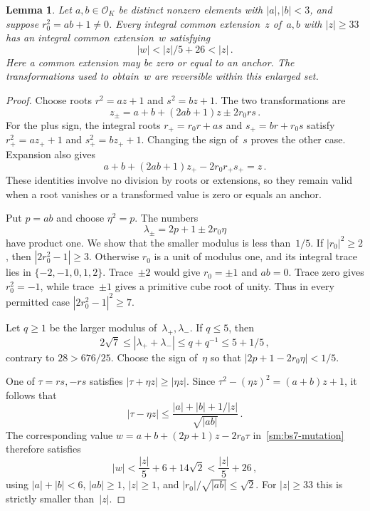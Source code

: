 \documentclass[12pt]{article}
\newtheorem{lemma}[theorem]{Lemma}
\newcommand{\OK}{\mathcal O_K}
\numberwithin{equation}{section}
\begin{document}
\begin{lemma}\label{sm:bs7-descent}
Let $a,b\in\OK$ be distinct nonzero elements with $|a|,|b|<3$, and suppose $r_0^2=ab+1\ne0$. Every integral common extension~$z$ of~$a,b$ with $|z|\ge33$ has an integral common extension~$w$ satisfying
\begin{equation*}
 |w|<|z|/5+26<|z|\,.
\end{equation*}
Here a common extension may be zero or equal to an anchor. The transformations used to obtain~$w$ are reversible within this enlarged set.
\end{lemma}
\begin{proof}
Choose roots $r^2=az+1$ and $s^2=bz+1$. The two transformations are
\begin{equation}\label{sm:bs7-mutation}
 z_\pm=a+b+(2ab+1)z\pm2r_0rs\,.
\end{equation}
For the plus sign, the integral roots $r_+=r_0r+as$ and $s_+=br+r_0s$ satisfy $r_+^2=az_++1$ and $s_+^2=bz_++1$. Changing the sign of~$s$ proves the other case. Expansion also gives
\begin{equation*}
 a+b+(2ab+1)z_+-2r_0r_+s_+=z\,.
\end{equation*}
These identities involve no division by roots or extensions, so they remain valid when a root vanishes or a transformed value is zero or equals an anchor.

Put $p=ab$ and choose $\eta^2=p$. The numbers
\begin{equation*}
 \lambda_\pm=2p+1\pm2r_0\eta
\end{equation*}
have product one. We show that the smaller modulus is less than~$1/5$. If $|r_0|^2\ge2$, then $|2r_0^2-1|\ge3$. Otherwise $r_0$ is a unit of modulus one, and its integral trace lies in $\{-2,-1,0,1,2\}$. Trace~$\pm2$ would give $r_0=\pm1$ and $ab=0$. Trace zero gives $r_0^2=-1$, while trace~$\pm1$ gives a primitive cube root of unity. Thus in every permitted case $|2r_0^2-1|^2\ge7$.

Let $q\ge1$ be the larger modulus of~$\lambda_+,\lambda_-$. If $q\le5$, then
\begin{equation*}
 2\sqrt7\le|\lambda_++\lambda_-|\le q+q^{-1}\le5+1/5\,,
\end{equation*}
contrary to $28>676/25$. Choose the sign of~$\eta$ so that $|2p+1-2r_0\eta|<1/5$.

One of $\tau=rs,-rs$ satisfies $|\tau+\eta z|\ge|\eta z|$. Since $\tau^2-(\eta z)^2=(a+b)z+1$, it follows that
\begin{equation*}
 |\tau-\eta z|\le\frac{|a|+|b|+1/|z|}{\sqrt{|ab|}}\,.
\end{equation*}
The corresponding value $w=a+b+(2p+1)z-2r_0\tau$ in~\eqref{sm:bs7-mutation} therefore satisfies
\begin{equation*}
 |w|<\frac{|z|}{5}+6+14\sqrt2<\frac{|z|}{5}+26\,,
\end{equation*}
using $|a|+|b|<6$, $|ab|\ge1$, $|z|\ge1$, and $|r_0|/\sqrt{|ab|}\le\sqrt2$. For $|z|\ge33$ this is strictly smaller than~$|z|$.
\end{proof}
\end{document}
